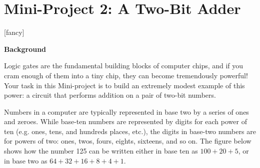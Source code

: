 \section*{Mini-Project 2: A Two-Bit Adder}
\label{lab_two_bit_adder}

[fancy]{%
	\fancyhead[LO,RE]{}
}
\pagestyle{interlude}


\bigskip

\textbf{Background}

Logic gates are the fundamental building blocks of computer chips, and if you cram enough of them into a tiny chip, they can become tremendously powerful!  Your task in this Mini-project is to build an extremely modest example of this power: a circuit that performs addition on a pair of two-bit numbers.

Numbers in a computer are typically represented in base two by a series of ones and zeroes.  While base-ten numbers are represented by digits for each power of ten (e.g. ones, tens, and hundreds places, etc.), the digits in base-two numbers are for powers of two: ones, twos, fours, eights, sixteens, and so on.  The figure below shows how the number 125 can be written either in base ten as $100 + 20 + 5$, or in base two as $64 + 32+16+8+4+1$.

